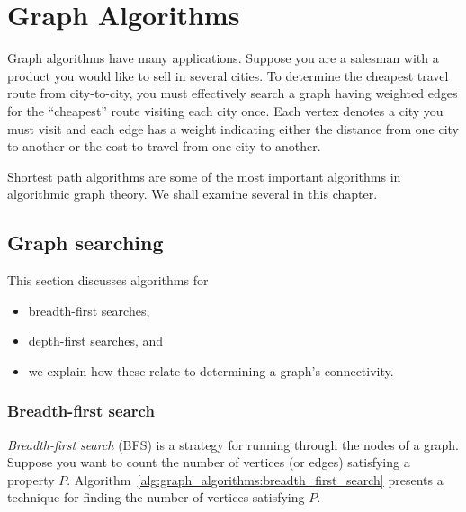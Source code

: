 
\chapter{Graph Algorithms}
\label{chap:graph_algorithms}

Graph algorithms have many applications. Suppose you are a salesman
with a product you would like to sell in several cities. To determine
the cheapest travel route from city-to-city, you must effectively
search a graph having weighted edges for the ``cheapest'' route
visiting each city once. Each vertex denotes a city you must visit and
each edge has a weight indicating either the distance from one city to
another or the cost to travel from one city to another.

Shortest path algorithms are some of the most important algorithms in
algorithmic graph theory. We shall examine several in this chapter.



\section{Graph searching}

This section discusses algorithms for

\begin{itemize}
\item
breadth-first searches,

\item
depth-first searches, and

\item
we explain how these relate to determining a graph's connectivity.
\end{itemize}



\subsection{Breadth-first search}

\emph{Breadth-first search} (BFS) is a strategy for running through
the nodes of a graph. Suppose you want to count the number of vertices
(or edges) satisfying a property
$P$. Algorithm~\ref{alg:graph_algorithms:breadth_first_search}
presents a technique for finding the number of vertices satisfying $P$.

